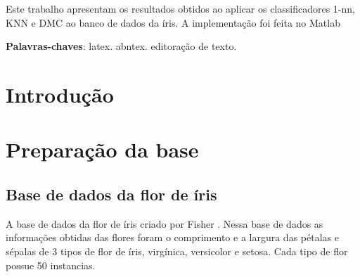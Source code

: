 \documentclass[ 
	article,			%
	11pt,				%
	oneside,			%
	a4paper,			%
	english,			%
	brazil,				%
	]{abntex2}
\begin{document}
\frenchspacing 


%
%
\maketitle

\begin{resumoumacoluna}
 Este trabalho apresentam os resultados obtidos ao aplicar os classificadores
 1-nn, KNN e DMC ao banco de dados da íris. A implementação foi feita no
 Matlab\texttrademark 
 
 
 \vspace{\onelineskip}
 
 \noindent
 \textbf{Palavras-chaves}: latex. abntex. editoração de texto.
\end{resumoumacoluna}


\textual

\section*{Introdução}


\section{Preparação da base}
\subsection{Base de dados da flor de íris}
A base de dados da flor de íris criado por Fisher \cite{AHG2137}. Nessa base de
dados as informações obtidas das flores foram o comprimento e a largura das
pétalas e sépalas de 3 tipos de flor de íris, virgínica, versicolor e setosa.
Cada tipo de flor possue 50 instancias.
\end{document}
